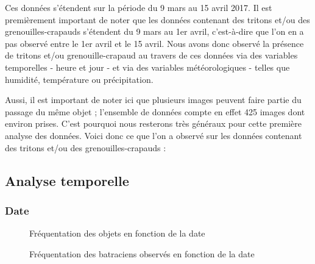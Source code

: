 \noindent Ces données s'étendent sur la période du 9 mars au 15 avril 2017. Il est premièrement important de noter que les données contenant des tritons et/ou des grenouilles-crapauds s'étendent du 9 mars au 1er avril, c'est-à-dire que l'on en a pas observé entre le 1er avril et le 15 avril. Nous avons donc observé la présence de tritons et/ou grenouille-crapaud au travers de ces données via des variables temporelles - heure et jour - et via des variables météorologiques - telles que humidité, température ou précipitation. \newline

Aussi, il est important de noter ici que plusieurs images peuvent faire partie du passage du même objet ; l'ensemble de données compte en effet 425 images dont environ prises. C'est pourquoi nous resterons très généraux pour cette première analyse des données. Voici donc ce que l'on a observé sur les données contenant des tritons et/ou des grenouilles-crapauds :

\subsection{Analyse temporelle}

\subsubsection{Date}

\begin{figure}[H]
    \centering
    \caption{Fréquentation des objets en fonction de la date}
    \label{fig:Fréquentation des objets en fonction de la date}
\end{figure}

\begin{figure}[H]
    \centering
    \caption{Fréquentation des batraciens observés en fonction de la date}
    \label{fig:Fréquentation des crapauducs en fonction de la date}
\end{figure}

